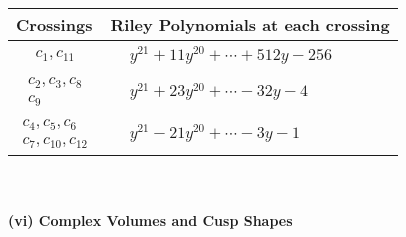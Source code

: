 \documentclass[1p]{elsarticle_modified}
\theoremstyle{definition}
\begin{document}
\begin{tabular}{m{50pt}|m{274pt}}
Crossings & \hspace{64pt}Riley Polynomials at each crossing \\
\hline $$\begin{aligned}c_{1},c_{11}\end{aligned}$$&$\begin{aligned}
&y^{21}+11 y^{20}+\cdots+512 y-256
\end{aligned}$\\
\hline $$\begin{aligned}c_{2},c_{3},c_{8}\\c_{9}\end{aligned}$$&$\begin{aligned}
&y^{21}+23 y^{20}+\cdots-32 y-4
\end{aligned}$\\
\hline $$\begin{aligned}c_{4},c_{5},c_{6}\\c_{7},c_{10},c_{12}\end{aligned}$$&$\begin{aligned}
&y^{21}-21 y^{20}+\cdots-3 y-1
\end{aligned}$\\
\hline
\end{tabular}\\~\\
\newpage\flushleft \textbf{(vi) Complex Volumes and Cusp Shapes}
\end{document}
